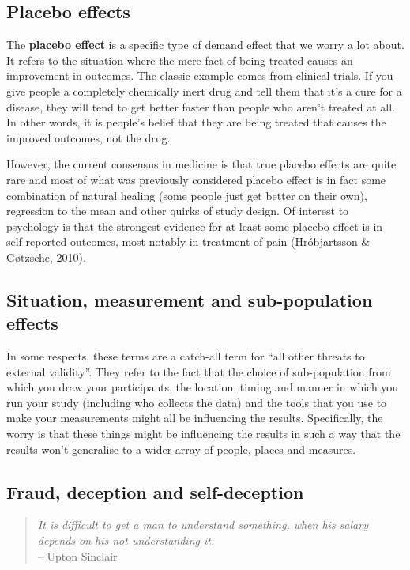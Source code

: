 \documentclass[
  a4paper,
]{book}
\begin{document}
\subsection{Placebo effects}\label{placebo-effects}

The \textbf{placebo effect} is a specific type of demand effect that we
worry a lot about. It refers to the situation where the mere fact of
being treated causes an improvement in outcomes. The classic example
comes from clinical trials. If you give people a completely chemically
inert drug and tell them that it's a cure for a disease, they will tend
to get better faster than people who aren't treated at all. In other
words, it is people's belief that they are being treated that causes the
improved outcomes, not the drug.

However, the current consensus in medicine is that true placebo effects
are quite rare and most of what was previously considered placebo effect
is in fact some combination of natural healing (some people just get
better on their own), regression to the mean and other quirks of study
design. Of interest to psychology is that the strongest evidence for at
least some placebo effect is in self-reported outcomes, most notably in
treatment of pain (Hróbjartsson \& Gøtzsche, 2010).

\subsection{Situation, measurement and sub-population
effects}\label{situation-measurement-and-sub-population-effects}

In some respects, these terms are a catch-all term for ``all other
threats to external validity''. They refer to the fact that the choice
of sub-population from which you draw your participants, the location,
timing and manner in which you run your study (including who collects
the data) and the tools that you use to make your measurements might all
be influencing the results. Specifically, the worry is that these things
might be influencing the results in such a way that the results won't
generalise to a wider array of people, places and measures.

\subsection{Fraud, deception and
self-deception}\label{fraud-deception-and-self-deception}

\begin{quote}
\emph{It is difficult to get a man to understand something, when his
salary depends on his not understanding it.}\\
-- Upton Sinclair
\end{quote}
\end{document}
